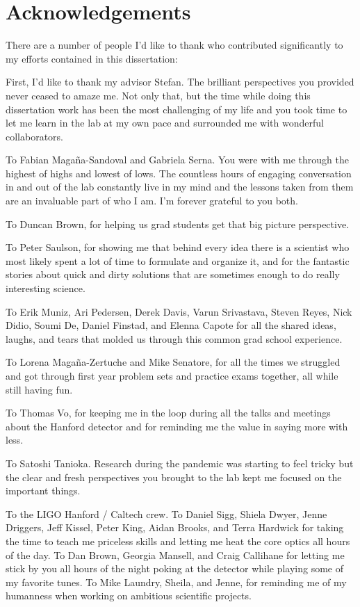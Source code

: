 \documentclass[12pt]{report}
\begin{document}
\chapter*{Acknowledgements}
There are a number of people I’d like to thank who contributed significantly to my efforts contained in this dissertation:

First, I’d like to thank my advisor Stefan. The brilliant perspectives you provided never ceased to amaze me. Not only that, but the time while doing this dissertation work has been the most challenging of my life and you took time to let me learn in the lab at my own pace and surrounded me with wonderful collaborators. 

To Fabian Maga\~{n}a-Sandoval and Gabriela Serna. You were with me through the highest of highs and lowest of lows. The countless hours of engaging conversation in and out of the lab constantly live in my mind and the lessons taken from them are an invaluable part of who I am. I’m forever grateful to you both. 

To Duncan Brown, for helping us grad students get that big picture perspective.

To Peter Saulson, for showing me that behind every idea there is a scientist who most likely spent a lot of time to formulate and organize it, and for the fantastic stories about quick and dirty solutions that are sometimes enough to do really interesting science.

To Erik Muniz, Ari Pedersen, Derek Davis, Varun Srivastava, Steven Reyes, Nick Didio, Soumi De, Daniel Finstad, and Elenna Capote for all the shared ideas, laughs, and tears that molded us through this common grad school experience. 

To Lorena Magaña-Zertuche and Mike Senatore, for all the times we struggled and got through first year problem sets and practice exams together, all while still having fun. 

To Thomas Vo, for keeping me in the loop during all the talks and meetings about the Hanford detector and for reminding me the value in saying more with less. 

To Satoshi Tanioka. Research during the pandemic was starting to feel tricky but the clear and fresh perspectives you brought to the lab kept me focused on the important things.

To the LIGO Hanford / Caltech crew. To Daniel Sigg, Shiela Dwyer, Jenne Driggers, Jeff Kissel, Peter King, Aidan Brooks, and Terra Hardwick for taking the time to teach me priceless skills and letting me heat the core optics all hours of the day. To Dan Brown, Georgia Mansell, and Craig Callihane for letting me stick by you all hours of the night poking at the detector while playing some of my favorite tunes. To Mike Laundry, Sheila, and Jenne, for reminding me of my humanness when working on ambitious scientific projects.
\end{document}
